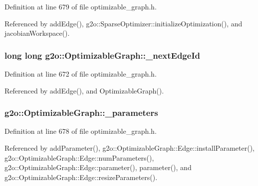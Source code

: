 Definition at line 679 of file optimizable\+\_\+graph.\+h.



Referenced by add\+Edge(), g2o\+::\+Sparse\+Optimizer\+::initialize\+Optimization(), and jacobian\+Workspace().

\subsubsection[{\texorpdfstring{\+\_\+next\+Edge\+Id}{_nextEdgeId}}]{\setlength{\rightskip}{0pt plus 5cm}long long g2o\+::\+Optimizable\+Graph\+::\+\_\+next\+Edge\+Id\hspace{0.3cm}{\ttfamily [protected]}}\hypertarget{structg2o_1_1OptimizableGraph_a93a7f05b31bca9ccaa214499f042739a}{}\label{structg2o_1_1OptimizableGraph_a93a7f05b31bca9ccaa214499f042739a}


Definition at line 672 of file optimizable\+\_\+graph.\+h.



Referenced by add\+Edge(), and Optimizable\+Graph().

\subsubsection[{\texorpdfstring{\+\_\+parameters}{_parameters}}]{ g2o\+::\+Optimizable\+Graph\+::\+\_\+parameters\hspace{0.3cm}{\ttfamily [protected]}}\hypertarget{structg2o_1_1OptimizableGraph_a3a7974befcd934f28a36de3999423d21}{}\label{structg2o_1_1OptimizableGraph_a3a7974befcd934f28a36de3999423d21}


Definition at line 678 of file optimizable\+\_\+graph.\+h.



Referenced by add\+Parameter(), g2o\+::\+Optimizable\+Graph\+::\+Edge\+::install\+Parameter(), g2o\+::\+Optimizable\+Graph\+::\+Edge\+::num\+Parameters(), g2o\+::\+Optimizable\+Graph\+::\+Edge\+::parameter(), parameter(), and g2o\+::\+Optimizable\+Graph\+::\+Edge\+::resize\+Parameters().

